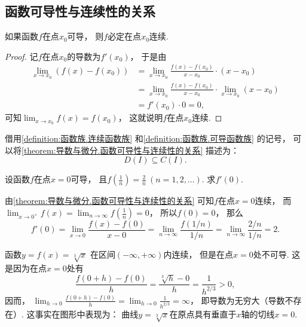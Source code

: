\subsection{函数可导性与连续性的关系}
\begin{theorem}\label{theorem:导数与微分.函数可导性与连续性的关系}
如果函数\(f\)在点\(x_0\)可导，
则\(f\)必定在点\(x_0\)连续.
\begin{proof}
记\(f\)在点\(x_0\)的导数为\(f'(x_0)\)，
于是由\begin{align*}
	\lim_{x \to x_0} (f(x) - f(x_0))
	&= \lim_{x \to x_0} \frac{f(x) - f(x_0)}{x - x_0} \cdot (x - x_0) \\
	&= \lim_{x \to x_0} \frac{f(x) - f(x_0)}{x - x_0} \cdot \lim_{x \to x_0} (x - x_0) \\
	&= f'(x_0) \cdot 0
	= 0,
\end{align*}
可知\(\lim_{x \to x_0} f(x) = f(x_0)\)，
这就说明\(f\)在点\(x_0\)连续.
\end{proof}
\end{theorem}
借用\cref{definition:函数族.连续函数族} 和\cref{definition:函数族.可导函数族} 的记号，
可以将\cref{theorem:导数与微分.函数可导性与连续性的关系} 描述为：\begin{equation*}
	D(I) \subseteq C(I).
\end{equation*}

\begin{example}
设函数\(f\)在点\(x=0\)可导，
且\(f\left( \frac1n \right) = \frac2n\ (n=1,2,\dotsc)\).
求\(f'(0)\).
\begin{solution}
由\cref{theorem:导数与微分.函数可导性与连续性的关系} 可知\(f\)在点\(x=0\)连续，
而\(\lim_{x\to0^+} f(x)
= \lim_{n\to\infty} f\left( \frac1n \right)
= 0\)，
所以\(f(0) = 0\)，
那么\begin{equation*}
	f'(0) = \lim_{x\to0} \frac{f(x) - f(0)}{x - 0}
	= \lim_{n\to\infty} \frac{f(1/n)}{1/n}
	= \lim_{n\to\infty} \frac{2/n}{1/n}
	= 2.
\end{equation*}
\end{solution}
\end{example}

\begin{example}\label{example:导数.函数在一点的导数是无穷大}
函数\(y=f(x)=\sqrt[3]x\)
在区间\((-\infty,+\infty)\)内连续，
但是在点\(x=0\)处不可导.
这是因为在点\(x=0\)处有\[
	\frac{f(0+h)-f(0)}{h}
	=\frac{\sqrt[3]{h}-0}{h}
	=\frac{1}{h^{2/3}}>0,
\]
因而，
\(\lim_{h\to0} \frac{f(0+h)-f(0)}{h}
=\lim_{h\to0} \frac{1}{h^{2/3}}
=\infty\)，
即导数为无穷大（导数不存在）.
这事实在图形中表现为：
曲线\(y=\sqrt[3]x\)在原点具有垂直于\(x\)轴的切线\(x=0\).
\end{example}

